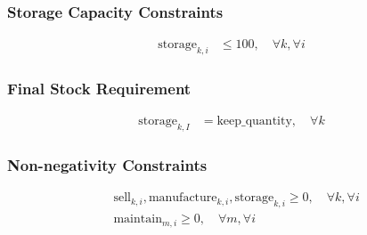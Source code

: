 \documentclass{article}
\begin{document}
\subsubsection*{Storage Capacity Constraints}
\begin{align*}
    \text{storage}_{k,i} &\leq 100, \quad \forall k, \forall i
\end{align*}

\subsubsection*{Final Stock Requirement}
\begin{align*}
    \text{storage}_{k,I} &= \text{keep\_quantity}, \quad \forall k
\end{align*}

\subsubsection*{Non-negativity Constraints}
\begin{align*}
    & \text{sell}_{k,i}, \text{manufacture}_{k,i}, \text{storage}_{k,i} \geq 0, \quad \forall k, \forall i \\
    & \text{maintain}_{m,i} \geq 0, \quad \forall m, \forall i
\end{align*}
\end{document}
